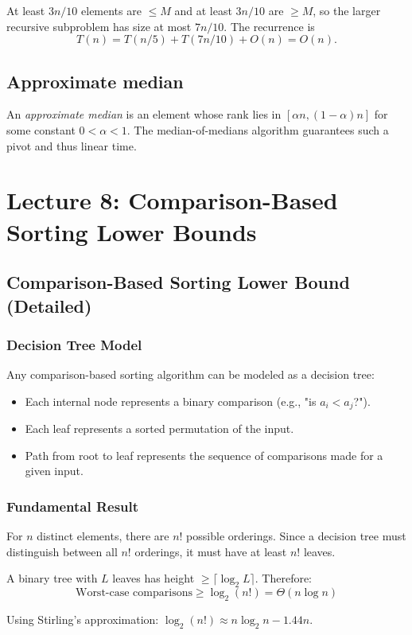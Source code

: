 \documentclass[11pt]{article}
\begin{document}
{{{At least $3n/10$ elements are $\le M$ and at least $3n/10$ are $\ge M$, so the larger recursive
subproblem has size at most $7n/10$. The recurrence is
\[
T(n) = T(n/5) + T(7n/10) + O(n) = O(n).
\]

\subsection*{Approximate median}
An \emph{approximate median} is an element whose rank lies in $[\alpha n, (1-\alpha)n]$ for some
constant $0<\alpha<1$. The median-of-medians algorithm guarantees such a pivot and thus linear time.

\section{Lecture 8: Comparison-Based Sorting Lower Bounds}

\subsection*{Comparison-Based Sorting Lower Bound (Detailed)}

\subsubsection*{Decision Tree Model}
Any comparison-based sorting algorithm can be modeled as a decision tree:
\begin{itemize}
\item Each internal node represents a binary comparison (e.g., "is $a_i < a_j$?").
\item Each leaf represents a sorted permutation of the input.
\item Path from root to leaf represents the sequence of comparisons made for a given input.
\end{itemize}

\subsubsection*{Fundamental Result}
For $n$ distinct elements, there are $n!$ possible orderings. Since a decision tree must distinguish between all $n!$ orderings, it must have at least $n!$ leaves.

A binary tree with $L$ leaves has height $\ge \lceil \log_2 L \rceil$. Therefore:
\[
\text{Worst-case comparisons} \ge \log_2(n!) = \Theta(n \log n)
\]

Using Stirling's approximation: $\log_2(n!) \approx n \log_2 n - 1.44n$.

}}}
\end{document}
